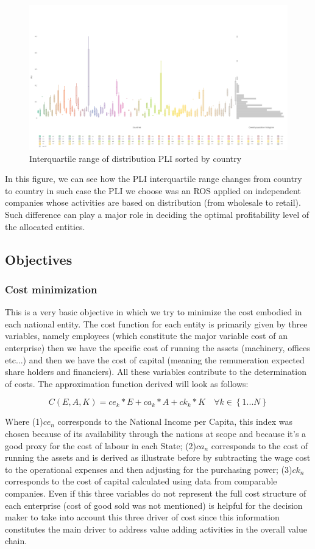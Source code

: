 \documentclass{article}
\begin{document}
\begin{figure}[H]
\centering
\includegraphics[width=\textwidth]{Images/plidist.png}
\caption{Interquartile range of distribution PLI sorted by country}
\end{figure}

In this figure, we can see how the PLI interquartile range changes from country to country in such case the PLI we choose was an ROS applied on independent companies whose activities are based on distribution (from wholesale to retail). Such difference can play a major role in deciding the optimal profitability level of the allocated entities.

\subsection{Objectives}

\subsubsection{Cost minimization}
This is a very basic objective in which we try to minimize the cost embodied in each national entity. The cost function for each entity is primarily given by three variables, namely employees (which constitute the major variable cost of an enterprise) then we have the specific cost of running the assets (machinery, offices etc...) and then we have the cost of capital (meaning the remuneration expected share holders and financiers). All these variables contribute to the determination of costs. The approximation function derived will look as follows:

\[
C(E,A,K)=ce_k*E+ca_k*A+ck_k*K \quad \forall k \in \left\{1...N\right\}
\]

Where (1)$ce_n$ corresponds to the National Income per Capita, this index was chosen because of its availability through the nations at scope and because it's a good proxy for the cost of labour in each State; (2)$ca_n$ corresponds to the cost of running the assets and is derived as illustrate before by subtracting the wage cost to the operational expenses and then adjusting for the purchasing power; (3)$ck_n$ corresponds to the cost of capital calculated using data from comparable companies.
Even if this three variables do not represent the full cost structure of each enterprise (cost of good sold was not mentioned) is helpful for the decision maker to take into account this three driver of cost since this information constitutes the main driver to address value adding activities in the overall value chain.
\end{document}
